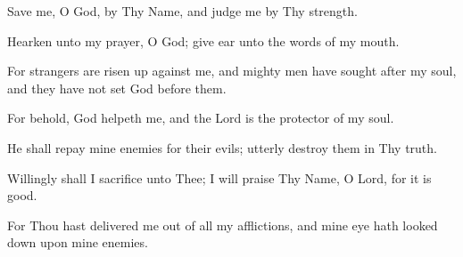 Save me, O God, by Thy Name, and judge me by Thy strength.

Hearken unto my prayer, O God; give ear unto the words of my mouth.

For strangers are risen up against me, and mighty men have sought after my soul, and they have not set God before them.

For behold, God helpeth me, and the Lord is the protector of my soul.

He shall repay mine enemies for their evils; utterly destroy them in Thy truth.

Willingly shall I sacrifice unto Thee; I will praise Thy Name, O Lord, for it is good.

For Thou hast delivered me out of all my afflictions, and mine eye hath looked down upon mine enemies.
